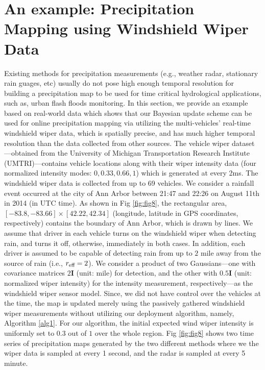 \documentclass[journal]{IEEEtran}
\begin{document}
\section{An example: Precipitation Mapping using Windshield Wiper Data}
\label{sec:sec8}
Existing methods for precipitation measurements (e.g., weather radar, stationary rain guages, etc) usually do not pose high enough temporal resolution for building a precipitation map to be used for time critical hydrological applications, such as, urban flash floods monitoring. In this section, we provide an example based on real-world data which shows that our Bayesian update scheme can be used for online precipitation mapping via utilizing the multi-vehicles' real-time windshield wiper data, which is spatially precise, and has much higher temporal resolution than the data collected from other sources.
The vehicle wiper dataset---obtained from the University
of Michigan Transportation Research Institute
(UMTRI)---contains vehicle locations along with their wiper
intensity data (four normalized intensity modes: $0,0.33,0.66,1$) which is generated at every 2ms. The windshield wiper data is collected from up to 69 vehicles. 
 We consider a rainfall event occurred at the city of Ann Arbor between 21:47 and 22:26 on August 11th in 2014 (in UTC time). As shown in Fig \ref{fig:fig8}, the rectangular area, $[-83.8,-83.66] \times [42.22,42.34]$ (longitude, latitude in GPS coordinates, respectively) contains the boundary of Ann Arbor, which is drawn by lines. We assume that driver in each vehicle turns on the windshield wiper when detecting rain, and turns it off, otherwise, immediately in both cases. In addition, each driver is assumed to be capable of detecting rain from up to $2$ mile away from the source of rain (i.e., $r_{\textup{eff}} = 2$). We consider a product of two Gaussians---one with covariance matrices $2\mathbf{I}$ (unit: mile) for detection, and the other with $0.5\mathbf{I}$ (unit: normalized wiper intensity) for the intensity measurement, respectively---as the windshield wiper sensor model. Since, we did not have control over the vehicles at the time, the map is updated merely using the passively gathered windshield wiper measurements without utilizing our deployment algorithm, namely, Algorithm \ref{alg1}. For our algorithm, the initial expected wind wiper intensity is uniformly set to $0.3$ out of $1$ over the whole region. 
Fig \ref{fig:fig8} shows two time series of precipitation maps generated by the two different methods where we the wiper data is sampled at every 1 second, and the radar is sampled at every 5 minute.
\end{document}
